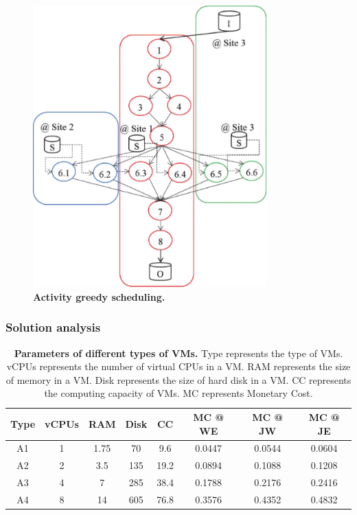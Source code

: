 \begin{figure}[htbp]
\begin{centering}
\captionsetup{justification=centering}
\includegraphics[width=90mm]{figures/FIG5}
\par\end{centering}
\caption{\textbf{Activity greedy scheduling.}}
\label{fig:ActGreedy}
\end{figure}

\subsubsection{Solution analysis}

\begin{table}[htbp]
\caption{\textbf{Parameters of different types of VMs. } Type represents the type of VMs. vCPUs represents the number of virtual CPUs in a VM. RAM represents the size of memory in a VM. Disk represents the size of hard disk in a VM. CC represents the computing capacity of VMs. MC represents Monetary Cost.} 
\label{tab:VMP}
\begin{centering}
\captionsetup{justification=centering}
\begin{tabular}{|c|c|c|c|c|c|c|c|}
\hline 
Type & vCPUs & RAM & Disk & CC & MC @ WE & MC @ JW & MC @ JE \tabularnewline
\hline 
A1 & 1 & 1.75 & 70 & 9.6 & 0.0447 & 0.0544 & 0.0604 \tabularnewline
A2 & 2 & 3.5 & 135 & 19.2 & 0.0894 & 0.1088 & 0.1208\tabularnewline
A3 & 4 & 7 & 285 & 38.4 & 0.1788 & 0.2176 & 0.2416 \tabularnewline
A4 & 8 & 14 & 605 & 76.8 & 0.3576 & 0.4352 & 0.4832 \tabularnewline
\hline 
\end{tabular}
\par\end{centering} 
\end{table}

